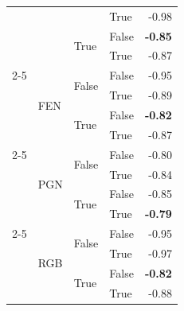 \documentclass{article}
\begin{document}
\begin{table}
\begin{center}
{\begin{tabular}{@{}llllr@{}}
                                    &                           &                           & True                      & -0.98 \\
                                    &                           & \multirow[c]{2}{*}{True}  & False                     & \textbf{-0.85} \\
                                    &                           &                           & True                      & -0.87 \\
    \cmidrule{2-5}
                                    & \multirow[c]{4}{*}{FEN}   & \multirow[c]{2}{*}{False} & False                     & -0.95 \\
                                    &                           &                           & True                      & -0.89 \\
                                    &                           & \multirow[c]{2}{*}{True}  & False                     & \textbf{-0.82} \\
                                    &                           &                           & True                      & -0.87 \\
    \cmidrule{2-5}
                                    & \multirow[c]{4}{*}{PGN}   & \multirow[c]{2}{*}{False} & False                     & -0.80 \\
                                    &                           &                           & True                      & -0.84 \\
                                    &                           & \multirow[c]{2}{*}{True}  & False                     & -0.85 \\
                                    &                           &                           & True                      & \textbf{-0.79} \\
    \cmidrule{2-5}
                                    & \multirow[c]{4}{*}{RGB}   & \multirow[c]{2}{*}{False} & False                     & -0.95 \\
                                    &                           &                           & True                      & -0.97 \\
                                    &                           & \multirow[c]{2}{*}{True}  & False                     & \textbf{-0.82} \\
                                    &                           &                           & True                      & -0.88 \\
   \bottomrule
\end{tabular}
}
    \end{center}
    \label{tab:chess-ablation-openai}
\end{table}
\end{document}
